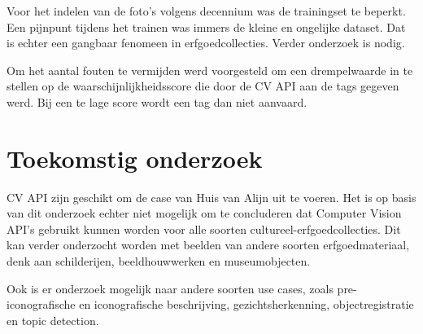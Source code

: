 \documentclass[a0,portrait]{a0poster}
\begin{document}
\begin{multicols}{2}
Voor het indelen van de foto's volgens decennium was de trainingset te beperkt. Een pijnpunt tijdens het trainen was immers de kleine en ongelijke dataset. Dat is echter een gangbaar fenomeen in erfgoedcollecties. Verder onderzoek is nodig. 

Om het aantal fouten te vermijden werd voorgesteld om een drempelwaarde in te stellen op de waarschijnlijkheidsscore die door de CV API aan de tags gegeven werd. Bij een te lage score wordt een tag dan niet aanvaard.


\color{HoGentAccent1} 
\section*{Toekomstig onderzoek}
\color{black}

CV API zijn geschikt om de case van Huis van Alijn uit te voeren. Het is op basis van dit onderzoek echter niet mogelijk om te concluderen dat Computer Vision API's gebruikt kunnen worden voor alle soorten cultureel-erfgoedcollecties.  Dit kan verder onderzocht worden met beelden van andere soorten erfgoedmateriaal, denk aan schilderijen, beeldhouwwerken en museumobjecten.

Ook is er onderzoek mogelijk naar andere soorten use cases, zoals pre-iconografische en iconografische beschrijving, gezichtsherkenning, objectregistratie en topic detection.


\end{multicols}
\end{document}
